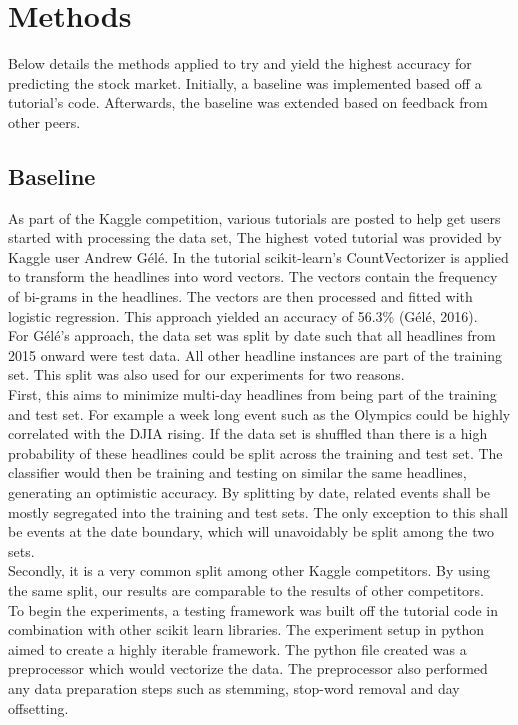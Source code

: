 \documentclass[11pt,a4paper]{article}
\begin{document}
\section{Methods}
Below details the methods applied to try and yield the highest accuracy for predicting the stock market. Initially, a baseline was implemented based off a tutorial's code. Afterwards, the baseline was extended based on feedback from other peers.\\

\subsection{Baseline}
As part of the Kaggle competition, various tutorials are posted to help get users started with processing the data set, The highest voted tutorial was provided by Kaggle user Andrew G\'el\'e. In the tutorial scikit-learn’s CountVectorizer is applied to transform the headlines into word vectors. The vectors contain the frequency of bi-grams in the headlines. The vectors are then processed and fitted with logistic regression. This approach yielded an accuracy of 56.3\% (G\'el\'e, 2016).\\

For G\'el\'e’s approach, the data set was split by date such that all headlines from 2015 onward were test data. All other headline instances are part of the training set. This split was also used for our experiments for two reasons.\\

First, this aims to minimize multi-day headlines from being part of the training and test set. For example a week long event such as the Olympics could be highly correlated with the DJIA rising. If the data set is shuffled than there is a high probability of these headlines could be split across the training and test set. The classifier would then be training and testing on similar the same headlines, generating an optimistic accuracy. By splitting by date, related events shall be mostly segregated into the training and test sets. The only exception to this shall be events at the date boundary, which will unavoidably be split among the two sets.\\

Secondly, it is a very common split among other Kaggle competitors. By using the same split, our results are comparable to the results of other competitors.\\

To begin the experiments, a testing framework was built off the tutorial code in combination with other scikit learn libraries. The experiment setup in python aimed to create a highly iterable framework. The python file created was a preprocessor which would vectorize the data. The preprocessor also performed any data preparation steps such as stemming, stop-word removal and day offsetting.\\
\end{document}
